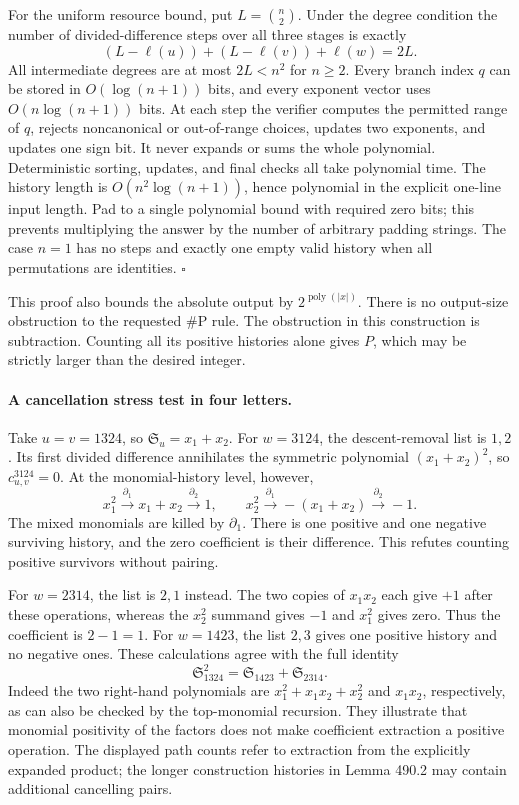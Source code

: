\documentclass[11pt]{article}
\begin{document}
For the uniform resource bound, put $L=\binom n2$. Under the degree
condition the number of divided-difference steps over all three stages is
exactly
\[
                 (L-\ell(u))+(L-\ell(v))+\ell(w)=2L.
\]
All intermediate degrees are at most $2L<n^2$ for $n\geq2$. Every
branch index $q$ can be stored in $O(\log(n+1))$ bits, and every exponent
vector uses $O(n\log(n+1))$ bits. At each step the verifier computes
the permitted range of $q$, rejects noncanonical or out-of-range choices,
updates two exponents, and updates one sign bit. It never expands or sums
the whole polynomial. Deterministic sorting, updates, and final checks all
take polynomial time. The history length is $O(n^2\log(n+1))$, hence
polynomial in the explicit one-line input length. Pad to a single polynomial
bound with required zero bits; this prevents multiplying the answer by
the number of arbitrary padding strings. The case $n=1$ has no steps
and exactly one empty valid history when all permutations are identities.
\hfill$\square$

This proof also bounds the absolute output by $2^{\operatorname{poly}(|x|)}$.
There is no output-size obstruction to the requested $\#\mathrm P$ rule.
The obstruction in this construction is subtraction. Counting all its
positive histories alone gives $P$, which may be strictly larger than
the desired integer.

\paragraph{A cancellation stress test in four letters.}
Take $u=v=1324$, so $\mathfrak S_u=x_1+x_2$. For $w=3124$, the
descent-removal list is $1,2$. Its first divided difference annihilates
the symmetric polynomial $(x_1+x_2)^2$, so $c_{u,v}^{3124}=0$.
At the monomial-history level, however,
\[
 x_1^2\xrightarrow{\partial_1}x_1+x_2
       \xrightarrow{\partial_2}1,\qquad
 x_2^2\xrightarrow{\partial_1}-(x_1+x_2)
       \xrightarrow{\partial_2}-1.
\]
The mixed monomials are killed by $\partial_1$. There is one positive
and one negative surviving history, and the zero coefficient is their
difference. This refutes counting positive survivors without pairing.

For $w=2314$, the list is $2,1$ instead. The two copies of $x_1x_2$
each give $+1$ after these operations, whereas the $x_2^2$ summand gives
$-1$ and $x_1^2$ gives zero. Thus the coefficient is $2-1=1$.
For $w=1423$, the list $2,3$ gives one positive history and no negative
ones. These calculations agree with the full identity
\begin{equation}\label{a490:example}
                    \mathfrak S_{1324}^2
                     =\mathfrak S_{1423}+\mathfrak S_{2314}.
\end{equation}
Indeed the two right-hand polynomials are
$x_1^2+x_1x_2+x_2^2$ and $x_1x_2$, respectively, as can also be
checked by the top-monomial recursion. They illustrate that monomial
positivity of the factors does not make coefficient extraction a positive
operation. The displayed path counts refer to extraction from the explicitly
expanded product; the longer construction histories in Lemma 490.2 may
contain additional cancelling pairs.
\end{document}
